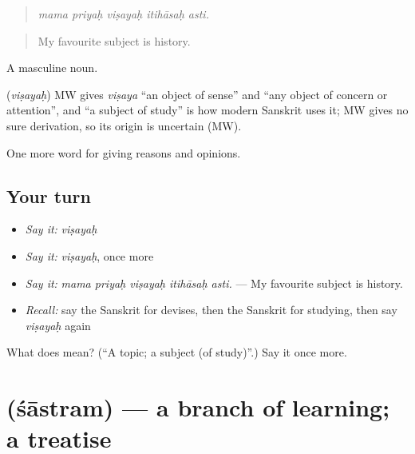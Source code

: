 \begin{quote}
    
\end{quote}

\begin{quote}
\emph{mama priyaḥ viṣayaḥ itihāsaḥ asti.}
\end{quote}

\begin{quote}
My favourite subject is history.
\end{quote}

A masculine noun.

\begin{cousinweb}
\textbf{} (\emph{viṣayaḥ}) MW gives \emph{viṣaya} \textquotedblleft{}an object of sense\textquotedblright{} and \textquotedblleft{}any object of concern or attention\textquotedblright{}, and \textquotedblleft{}a subject of study\textquotedblright{} is how modern Sanskrit uses it; MW gives no sure derivation, so its origin is uncertain (MW).
\end{cousinweb}

\begin{grammarlens}[title={What you've built}]
One more word for giving reasons and opinions.
\end{grammarlens}

\subsection*{Your turn}
\begin{itemize}
\raggedright
  \item \emph{Say it:} \emph{viṣayaḥ}
  \item \emph{Say it:} \emph{viṣayaḥ}, once more
  \item \emph{Say it:} \emph{mama priyaḥ viṣayaḥ itihāsaḥ asti.} — My favourite subject is history.
  \item \emph{Recall:} say the Sanskrit for devises, then the Sanskrit for studying, then say \emph{viṣayaḥ} again
\end{itemize}

\begin{tcolorbox}[breakable,colback=teal!4,colframe=teal!35!black,title={Before you move on}]
What does  mean? (\textquotedblleft{}A topic; a subject (of study)\textquotedblright{}.) Say it once more.
\end{tcolorbox}
\section[\texorpdfstring{\sk{शास्त्रम्} (śāstram)}{शास्त्रम् (śāstram)}]{ (śāstram) — a branch of learning; a treatise}

